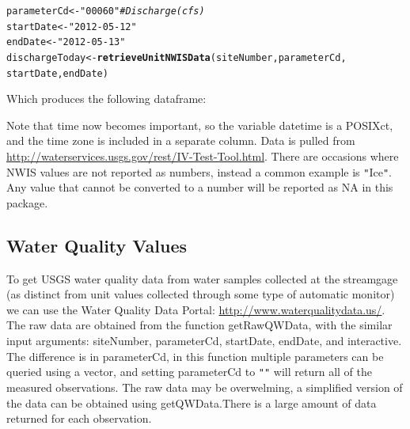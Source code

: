 \documentclass[a4paper,11pt]{article}\usepackage[]{graphicx}\usepackage[]{color}
\makeatletter
\newcommand{\hlstr}[1]{\textcolor[rgb]{0.192,0.494,0.8}{#1}}%
\newcommand{\hlcom}[1]{\textcolor[rgb]{0.678,0.584,0.686}{\textit{#1}}}%
\newcommand{\hlstd}[1]{\textcolor[rgb]{0.345,0.345,0.345}{#1}}%
\newcommand{\hlkwb}[1]{\textcolor[rgb]{0.69,0.353,0.396}{#1}}%
\newcommand{\hlkwd}[1]{\textcolor[rgb]{0.737,0.353,0.396}{\textbf{#1}}}%
\newenvironment{kframe}{%
 \def\at@end@of@kframe{}%
 \ifinner\ifhmode%
  \def\at@end@of@kframe{\end{minipage}}%
  \begin{minipage}{\columnwidth}%
 \fi\fi%
 \def\FrameCommand##1{\hskip\@totalleftmargin \hskip-\fboxsep
 \colorbox{shadecolor}{##1}\hskip-\fboxsep
     \hskip-\linewidth \hskip-\@totalleftmargin \hskip\columnwidth}%
 \MakeFramed {\advance\hsize-\width
   \@totalleftmargin\z@ \linewidth\hsize
   \@setminipage}}%
 {\par\unskip\endMakeFramed%
 \at@end@of@kframe}
\newenvironment{knitrout}{}{} %
\makeatother
\begin{document}
\begin{knitrout}
\color{fgcolor}\begin{kframe}
\begin{alltt}
\hlstd{parameterCd} \hlkwb{<-} \hlstr{"00060"}  \hlcom{# Discharge (cfs)}
\hlstd{startDate} \hlkwb{<-} \hlstr{"2012-05-12"}
\hlstd{endDate} \hlkwb{<-} \hlstr{"2012-05-13"}
\hlstd{dischargeToday} \hlkwb{<-} \hlkwd{retrieveUnitNWISData}\hlstd{(siteNumber, parameterCd,}
        \hlstd{startDate, endDate)}
\end{alltt}


{\ttfamily\noindent\bfseries\color{errorcolor}{Error: invalid 'file' argument}}\end{kframe}
\end{knitrout}

Which produces the following dataframe:
\begin{knitrout}
\color{fgcolor}\begin{kframe}


{\ttfamily\noindent\bfseries\color{errorcolor}{Error: object 'dischargeToday' not found}}\end{kframe}
\end{knitrout}


Note that time now becomes important, so the variable datetime is a POSIXct, and the time zone is included in a separate column. Data is pulled from \url{http://waterservices.usgs.gov/rest/IV-Test-Tool.html}. There are occasions where NWIS values are not reported as numbers, instead a common example is \texttt{"}Ice\texttt{"}.  Any value that cannot be converted to a number will be reported as NA in this package.

\newpage


\FloatBarrier

\subsection{Water Quality Values}
\label{sec:usgsWQP}
To get USGS water quality data from water samples collected at the streamgage (as distinct from unit values collected through some type of automatic monitor) we can use the Water Quality Data Portal: \url{http://www.waterqualitydata.us/}. The raw data are obtained from the function  getRawQWData, with the similar input arguments: siteNumber, parameterCd, startDate, endDate, and interactive. The difference is in parameterCd, in this function multiple parameters can be queried using a vector, and setting parameterCd to \texttt{"}\texttt{"} will return all of the measured observations. The raw data may be overwelming, a simplified version of the data can be obtained using getQWData.There is a large amount of data returned for each observation. 
\end{document}
